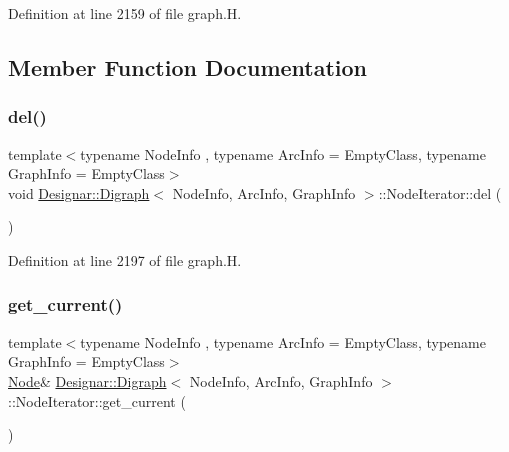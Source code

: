 Definition at line 2159 of file graph.\+H.



\subsection{Member Function Documentation}
\mbox{\label{class_designar_1_1_digraph_1_1_node_iterator_a8d68d82384631f601055ef9b742b0dbf}} 
\subsubsection{\texorpdfstring{del()}{del()}}
{\footnotesize\ttfamily template$<$typename Node\+Info , typename Arc\+Info  = Empty\+Class, typename Graph\+Info  = Empty\+Class$>$ \\
void \hyperlink{class_designar_1_1_digraph}{Designar\+::\+Digraph}$<$ Node\+Info, Arc\+Info, Graph\+Info $>$\+::Node\+Iterator\+::del (\begin{DoxyParamCaption}{ }\end{DoxyParamCaption})\hspace{0.3cm}{\ttfamily [inline]}}



Definition at line 2197 of file graph.\+H.

\mbox{\label{class_designar_1_1_digraph_1_1_node_iterator_a2d9961869a4ec52a112354600094646c}} 
\subsubsection{\texorpdfstring{get\+\_\+current()}{get\_current()}\hspace{0.1cm}{\footnotesize\ttfamily [1/2]}}
{\footnotesize\ttfamily template$<$typename Node\+Info , typename Arc\+Info  = Empty\+Class, typename Graph\+Info  = Empty\+Class$>$ \\
\hyperlink{class_designar_1_1_digraph_a4dc921c41a480b7946a04170e997d8ae}{Node}\& \hyperlink{class_designar_1_1_digraph}{Designar\+::\+Digraph}$<$ Node\+Info, Arc\+Info, Graph\+Info $>$\+::Node\+Iterator\+::get\+\_\+current (\begin{DoxyParamCaption}{ }\end{DoxyParamCaption})\hspace{0.3cm}{\ttfamily [inline]}}



